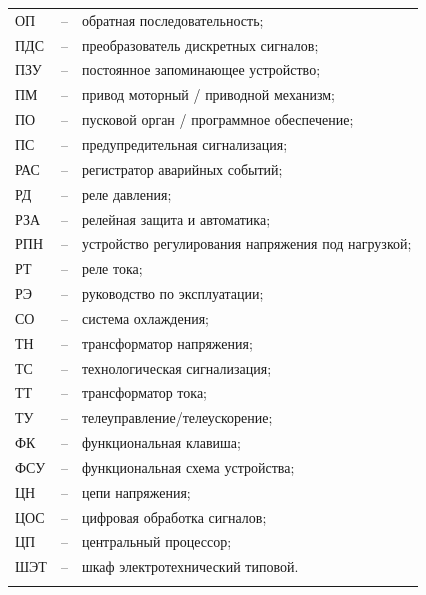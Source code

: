 \begin{longtable}{>{\raggedright\arraybackslash}m{2cm}>{\raggedright\arraybackslash}m{0.5cm}>{\raggedright\arraybackslash}m{20cm}}
ОП & -- & обратная последовательность; \\
ПДС & -- & преобразователь дискретных сигналов; \\
ПЗУ & -- & постоянное запоминающее устройство; \\
ПМ & -- & привод моторный / приводной механизм; \\
ПО & -- & пусковой орган / программное обеспечение; \\
ПС & -- & предупредительная сигнализация; \\
РАС & -- & регистратор аварийных событий; \\
РД & -- & реле давления; \\
РЗА & -- & релейная защита и автоматика; \\
РПН & -- & устройство регулирования напряжения под нагрузкой; \\
РТ & -- & реле тока; \\
РЭ & -- & руководство по эксплуатации; \\
СО & -- & система охлаждения; \\
ТН & -- & трансформатор напряжения; \\
ТС & -- & технологическая сигнализация; \\
ТТ & -- & трансформатор тока; \\
ТУ & -- & телеуправление/телеускорение; \\
ФК & -- & функциональная клавиша; \\
ФСУ & -- & функциональная схема устройства; \\
ЦН & -- & цепи напряжения; \\
ЦОС & -- & цифровая обработка сигналов; \\
ЦП & -- & центральный процессор; \\
ШЭТ & -- & шкаф электротехнический типовой. \\
{\color{white}\fontsize{0.1pt}{0.1pt}\selectfont<endABBRS>}
\end{longtable}
